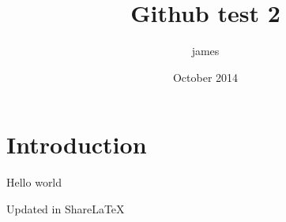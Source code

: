 \documentclass{article}
\title{Github test 2}
\author{james }
\date{October 2014}
\begin{document}
\maketitle

\section{Introduction}

Hello world

Updated in ShareLaTeX
\end{document}
